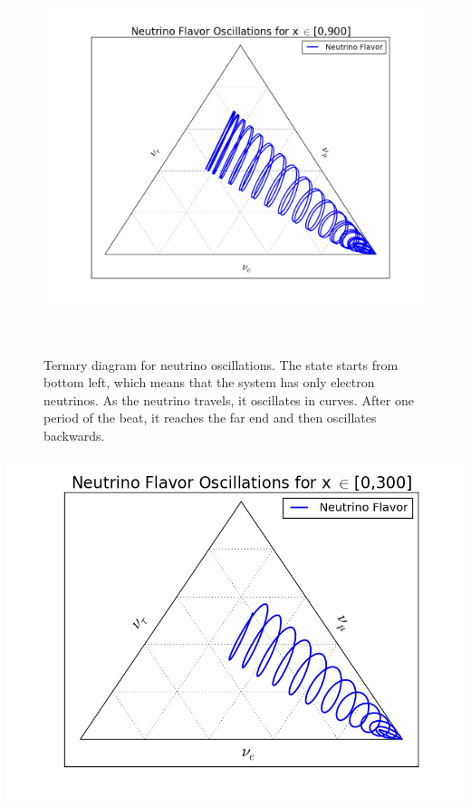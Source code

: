 \documentclass{tufte-handout}
\begin{document}
\begin{figure}
\centering
\includegraphics{assets/vacOsc3FlavorTernary900}
\caption{Ternary diagram for neutrino oscillations. The state starts from bottom left, which means that the system has only electron neutrinos. As the neutrino travels, it oscillates in curves. After one period of the beat, it reaches the far end and then oscillates backwards.}\
\label{fig:ternaryPlot900}
\end{figure}



\begin{marginfigure}
\includegraphics{assets/vacOsc3FlavorTernary300}
\end{marginfigure}
\end{document}
